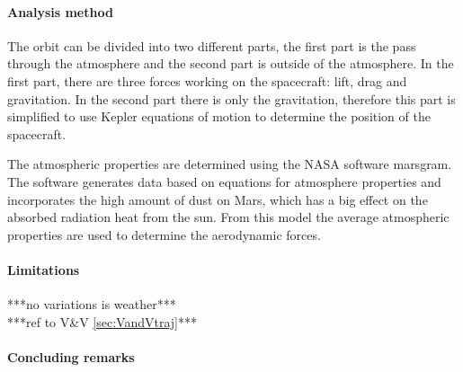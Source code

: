 \paragraph{Analysis method}
The orbit can be divided into two different parts, the first part is the pass through the atmosphere and the second part is outside of the atmosphere. In the first part, there are three forces working on the spacecraft: lift, drag and gravitation. In the second part there is only the gravitation, therefore this part is simplified to use Kepler equations of motion to determine the position of the spacecraft.

The atmospheric properties are determined using the NASA software \gls{marsgram}. The software generates data based on equations for atmosphere properties and incorporates the high amount of dust on Mars, which has a big effect on the absorbed radiation heat from the sun. From this model the average atmospheric properties are used to determine the aerodynamic forces.


\paragraph{Limitations}
***no variations is weather***\\
***ref to V\&V \ref{sec:VandVtraj}***

\paragraph{Concluding remarks}


